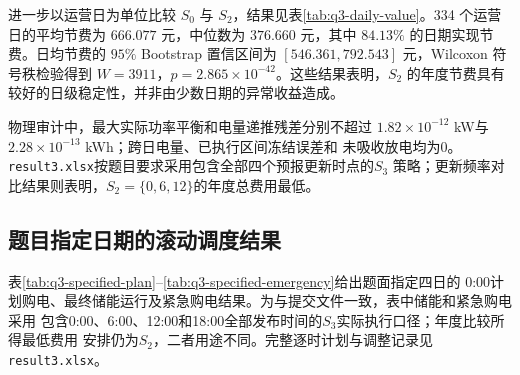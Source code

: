 进一步以运营日为单位比较 $S_0$ 与 $S_2$，结果见表\ref{tab:q3-daily-value}。334 个运营日的平均节费为 $666.077$ 元，中位数为 $376.660$ 元，其中 $84.13\%$ 的日期实现节费。日均节费的 $95\%$ Bootstrap 置信区间为 $[546.361,792.543]$ 元，Wilcoxon 符号秩检验得到 $W=3911$，$p=2.865\times10^{-42}$。这些结果表明，$S_2$ 的年度节费具有较好的日级稳定性，并非由少数日期的异常收益造成。


物理审计中，最大实际功率平衡和电量递推残差分别不超过
$1.82\times10^{-12}$ kW与$2.28\times10^{-13}$ kWh；跨日电量、已执行区间冻结误差和
未吸收放电均为0。\texttt{result3.xlsx}按题目要求采用包含全部四个预报更新时点的$S_3$
策略；更新频率对比结果则表明，$S_2=\{0,6,12\}$的年度总费用最低。

\subsection{题目指定日期的滚动调度结果}

表\ref{tab:q3-specified-plan}--\ref{tab:q3-specified-emergency}给出题面指定四日的
0:00计划购电、最终储能运行及紧急购电结果。为与提交文件一致，表中储能和紧急购电采用
包含0:00、6:00、12:00和18:00全部发布时间的$S_3$实际执行口径；年度比较所得最低费用
安排仍为$S_2$，二者用途不同。完整逐时计划与调整记录见\texttt{result3.xlsx}。


